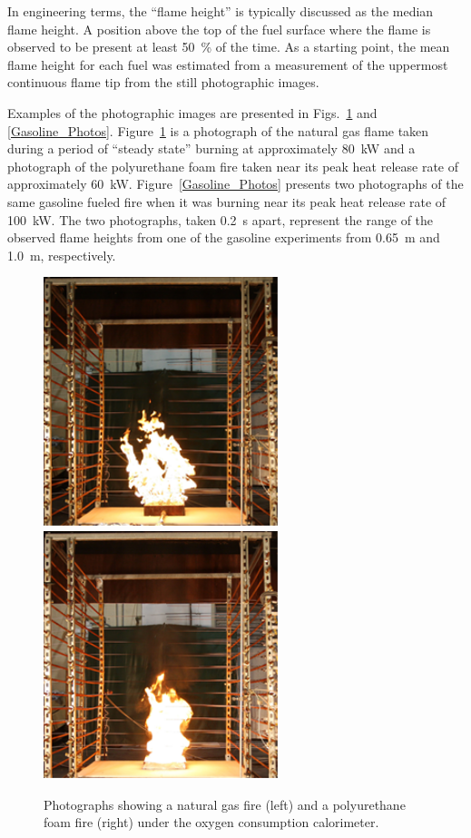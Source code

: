 \documentclass[twoside]{uocthesis}
\begin{document}
{{In engineering terms, the ``flame height'' is typically discussed as the median flame height.  A position above the top of the fuel surface where the flame is observed to be present at least 50~\% of the time.  As a starting point, the mean flame height for each fuel was estimated from a measurement of the uppermost continuous flame tip from the still photographic images.

Examples of the photographic images are presented in Figs.~\ref{Gas_Foam_Photos} and \ref{Gasoline_Photos}.  Figure~\ref{Gas_Foam_Photos} is a photograph of the natural gas flame taken during a period of ``steady state'' burning at approximately 80~kW and a photograph of the polyurethane foam fire taken near its peak heat release rate of approximately 60~kW.  Figure~\ref{Gasoline_Photos} presents two photographs of the same gasoline fueled fire when it was burning near its peak heat release rate of 100~kW.  The two photographs, taken 0.2~s apart, represent the range of the observed flame heights from one of the gasoline experiments from 0.65~m and 1.0~m, respectively.

\begin{figure}
  \includegraphics[width=2.7in]{../Figures/Fig14a}
  \includegraphics[width=2.7in]{../Figures/Fig14b} \\
  \caption[Photographs of the natural gas and polyurethane foam fires]{Photographs showing a natural gas fire (left) and a polyurethane foam fire (right) under the oxygen consumption calorimeter.}
  \label{Gas_Foam_Photos}
\end{figure}

}}
\end{document}
